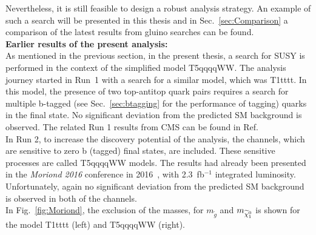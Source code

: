 Nevertheless, it is still feasible to design a robust analysis strategy. An example of such a search will be presented in this thesis and in Sec.~\ref{sec:Comparison} a comparison of the latest results from gluino searches can be found.\\
\textbf{Earlier results of the present analysis:}
\\
As mentioned in the previous section, in the present thesis, a search for SUSY is performed in the context of the simplified model T5qqqqWW. The analysis journey started in Run~1 with a search for a similar model, which was T1tttt. In this model, the presence of two top-antitop quark pairs requires a search for multiple b-tagged (see Sec.~\ref{sec:btagging} for the performance of tagging) quarks in the final state. No significant deviation from the predicted SM background is observed. The related Run 1 results from CMS can be found in Ref.~\cite{SUSRun1}  \\
In Run 2, to increase the discovery potential of the analysis, the channels, which are sensitive to zero b (tagged) final states, are included. These sensitive processes are called T5qqqqWW models. The results had already been presented in the \textit{Moriond 2016} conference in 2016~\cite{SUS_16_005}, with 2.3~fb$^{-1}$ integrated luminosity. Unfortunately, again no significant deviation from the predicted SM background is observed in both of the channels.\\
In Fig.~\ref{fig:Moriond}, the exclusion of the masses, for $m_{\tilde{g}}$ and $m_{\widetilde{\chi}^0_1}$ is shown for the model T1tttt (left) and T5qqqqWW (right).

